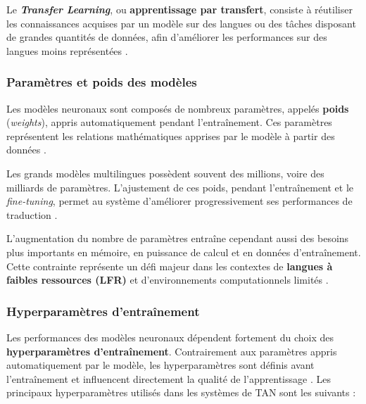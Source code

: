 Le \textbf{\textit{Transfer Learning}}, ou \textbf{apprentissage par transfert}, consiste à réutiliser les connaissances acquises par un modèle sur des langues ou des tâches disposant de grandes quantités de données, afin d'améliorer les performances sur des langues moins représentées \cite{nguyen2017transfer, lalrempuii2023investigating}.

\subsubsection{Paramètres et poids des modèles}

Les modèles neuronaux sont composés de nombreux paramètres, appelés \textbf{poids} (\textit{weights}), appris automatiquement pendant l'entraînement. Ces paramètres représentent les relations mathématiques apprises par le modèle à partir des données \cite{Goodfellow-et-al-2016}.

Les grands modèles multilingues possèdent souvent des millions, voire des milliards de paramètres. L'ajustement de ces poids, pendant l'entraînement et le \textit{fine-tuning}, permet au système d'améliorer progressivement ses performances de traduction \cite{kozhirbayev2024enhancing}.

L'augmentation du nombre de paramètres entraîne cependant aussi des besoins plus importants en mémoire, en puissance de calcul et en données d'entraînement. Cette contrainte représente un défi majeur dans les contextes de \textbf{langues à faibles ressources (\ac{LFR})} et d'environnements computationnels limités \cite{agyei2025dynamic}.
\subsubsection{Hyperparamètres d'entraînement}

Les performances des modèles neuronaux dépendent fortement du choix des \textbf{hyperparamètres d'entraînement}. Contrairement aux paramètres appris automatiquement par le modèle, les hyperparamètres sont définis avant l'entraînement et influencent directement la qualité de l'apprentissage \cite{Goodfellow-et-al-2016}. Les principaux hyperparamètres utilisés dans les systèmes de \ac{TAN} sont les suivants :


